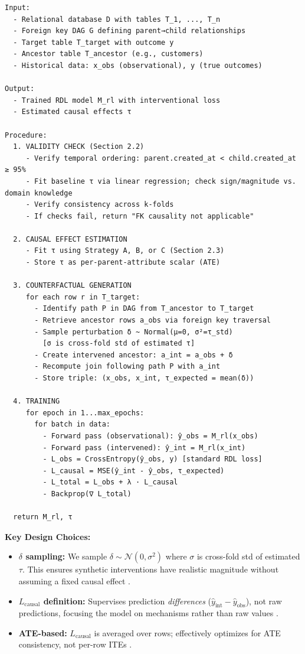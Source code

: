 \documentclass[11pt,letterpaper]{article}
\begin{document}
\begin{verbatim}
Input:
  - Relational database D with tables T_1, ..., T_n
  - Foreign key DAG G defining parent→child relationships
  - Target table T_target with outcome y
  - Ancestor table T_ancestor (e.g., customers)
  - Historical data: x_obs (observational), y (true outcomes)

Output:
  - Trained RDL model M_rl with interventional loss
  - Estimated causal effects τ

Procedure:
  1. VALIDITY CHECK (Section 2.2)
     - Verify temporal ordering: parent.created_at < child.created_at ≥ 95%
     - Fit baseline τ via linear regression; check sign/magnitude vs. domain knowledge
     - Verify consistency across k-folds
     - If checks fail, return "FK causality not applicable"

  2. CAUSAL EFFECT ESTIMATION
     - Fit τ using Strategy A, B, or C (Section 2.3)
     - Store τ as per-parent-attribute scalar (ATE)

  3. COUNTERFACTUAL GENERATION
     for each row r in T_target:
       - Identify path P in DAG from T_ancestor to T_target
       - Retrieve ancestor rows a_obs via foreign key traversal
       - Sample perturbation δ ~ Normal(μ=0, σ²=τ_std)
         [σ is cross-fold std of estimated τ]
       - Create intervened ancestor: a_int = a_obs + δ
       - Recompute join following path P with a_int
       - Store triple: (x_obs, x_int, τ_expected = mean(δ))

  4. TRAINING
     for epoch in 1...max_epochs:
       for batch in data:
         - Forward pass (observational): ŷ_obs = M_rl(x_obs)
         - Forward pass (intervened): ŷ_int = M_rl(x_int)
         - L_obs = CrossEntropy(ŷ_obs, y) [standard RDL loss]
         - L_causal = MSE(ŷ_int - ŷ_obs, τ_expected)
         - L_total = L_obs + λ · L_causal
         - Backprop(∇ L_total)

  return M_rl, τ
\end{verbatim}

\textbf{Key Design Choices:}

\begin{itemize}
\item \textbf{$\delta$ sampling:} We sample $\delta \sim \mathcal{N}(0, \sigma^2)$ where $\sigma$ is cross-fold std of estimated $\tau$. This ensures synthetic interventions have realistic magnitude without assuming a fixed causal effect \cite{Rubin1990}.

\item \textbf{$L_{\text{causal}}$ definition:} Supervises prediction \textit{differences} ($\hat{y}_{\text{int}} - \hat{y}_{\text{obs}}$), not raw predictions, focusing the model on mechanisms rather than raw values \cite{Rubin1990}.

\item \textbf{ATE-based:} $L_{\text{causal}}$ is averaged over rows; effectively optimizes for ATE consistency, not per-row ITEs \cite{Kunzel2019}.
\end{itemize}
\end{document}
